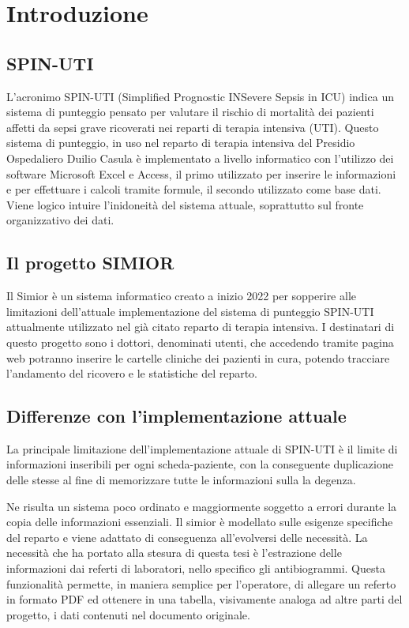 \chapter{Introduzione}
\section{SPIN-UTI}
L'acronimo SPIN-UTI (Simplified Prognostic INSevere Sepsis in ICU) indica un sistema di punteggio pensato per valutare il rischio di mortalità dei pazienti affetti da sepsi grave ricoverati nei reparti di terapia intensiva (UTI).
\newline
Questo sistema di punteggio, in uso nel reparto di terapia intensiva del Presidio Ospedaliero Duilio Casula è implementato a livello informatico con l'utilizzo dei software Microsoft Excel e Access, il primo utilizzato per inserire le informazioni e per effettuare i calcoli tramite formule, il secondo utilizzato come base dati.
Viene logico intuire l'inidoneità del sistema attuale, soprattutto sul fronte organizzativo dei dati.

\section{Il progetto SIMIOR}
Il Simior è un sistema informatico creato a inizio 2022 per sopperire alle limitazioni dell'attuale implementazione del sistema di punteggio SPIN-UTI attualmente utilizzato nel già citato reparto di terapia intensiva.
I destinatari di questo progetto sono i dottori, denominati utenti, che accedendo tramite pagina web potranno inserire le cartelle cliniche dei pazienti in cura, potendo tracciare l'andamento del ricovero e le statistiche del reparto.
\section{Differenze con l'implementazione attuale}
La principale limitazione dell'implementazione attuale di SPIN-UTI è il limite di informazioni inseribili per ogni scheda-paziente, con la conseguente duplicazione delle stesse al fine di memorizzare tutte le informazioni sulla la degenza. 

Ne risulta un sistema poco ordinato e maggiormente soggetto a errori durante la copia delle informazioni essenziali.
\newline
Il simior è modellato sulle esigenze specifiche del reparto e viene adattato di conseguenza all'evolversi delle necessità.
La necessità che ha portato alla stesura di questa tesi è l'estrazione delle informazioni dai referti di laboratori, nello specifico gli antibiogrammi.
Questa funzionalità permette, in maniera semplice per l'operatore, di allegare un referto in formato PDF ed ottenere in una tabella, visivamente analoga ad altre parti del progetto, i dati contenuti nel documento originale.
